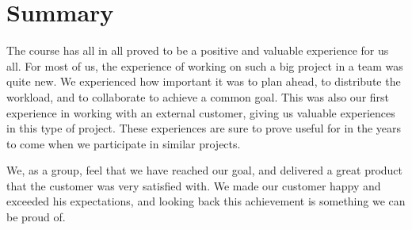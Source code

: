 \section{Summary}
The course has all in all proved to be a positive and valuable experience for us all. For most of us, the experience of working on such a big project in a team was quite new. We experienced how important it was to plan ahead, to distribute the workload, and to collaborate to achieve a common goal. This was also our first experience in working with an external customer, giving us valuable experiences in this type of project. These experiences are sure to prove useful for in the years to come when we participate in similar projects.

We, as a group, feel that we have reached our goal, and delivered a great product that the customer was very satisfied with. We made our customer happy and exceeded his expectations, and looking back this achievement is something we can be proud of.